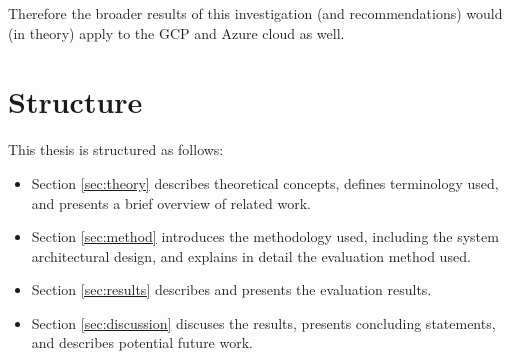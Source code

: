 Therefore the broader results of this investigation (and recommendations) would (in theory) apply to the GCP and Azure cloud as well.

\chapter{Structure}
This thesis is structured as follows:
\begin{itemize}
  \item Section \ref{sec:theory} describes theoretical concepts, defines terminology used, and presents a brief overview of related work.
  \item Section \ref{sec:method} introduces the methodology used, including the system architectural design, and explains in detail the evaluation method used.
  \item Section \ref{sec:results} describes and presents the evaluation results.
  \item Section \ref{sec:discussion} discuses the results, presents concluding statements, and describes potential future work.
\end{itemize}
